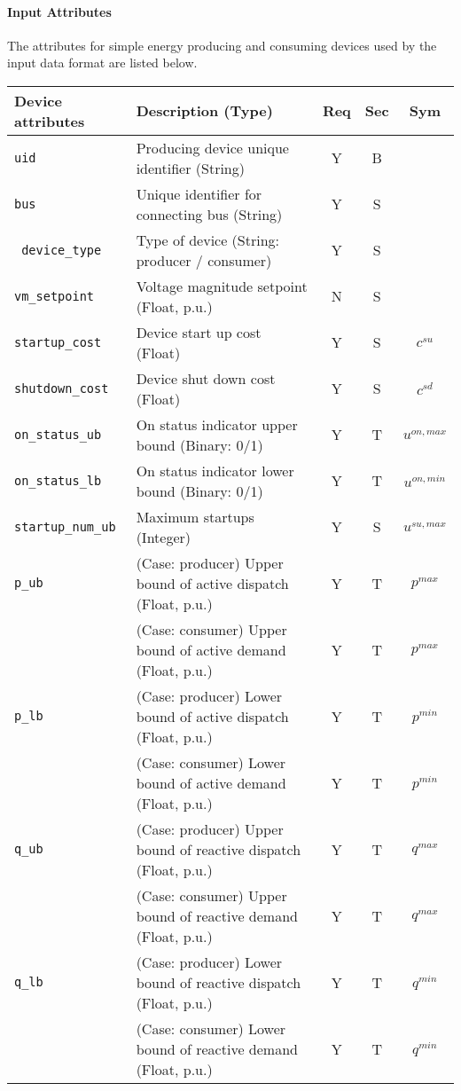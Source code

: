 \documentclass{article}
\begin{document}
\paragraph{Input Attributes} The attributes for 
simple energy producing and consuming devices used by the input data format are listed below.

\begin{center}
\small
\begin{tabular}{ l | l | c | c | c |}
Device attributes & Description (Type) & Req & Sec & Sym\\
\hline
  {\tt uid} & Producing device unique identifier (String) & Y & B &  \\
  {\tt bus} & Unique identifier for connecting bus (String)& Y & S & \\
  {\tt\color{red} device\_type} & Type of device (String: producer / consumer) & Y & S & \\
  {\tt vm\_setpoint} & Voltage magnitude setpoint (Float, p.u.) & N & S & \\
  {\tt startup\_cost} & Device start up cost (Float) & Y & S & $c^{su}$\\
  {\tt shutdown\_cost} & Device shut down cost (Float) & Y & S & $c^{sd}$\\  
  {\tt on\_status\_ub} & On status indicator upper bound (Binary: 0/1) & Y & T & $u^{on,max}$\\
  {\tt on\_status\_lb} & On status indicator lower bound (Binary: 0/1) & Y & T & $u^{on,min}$\\

  {\tt startup\_num\_ub} & Maximum startups (Integer) & Y & S & $u^{su,max}$\\  
  {\tt p\_ub} & {\color{red} (Case: producer) Upper bound of active dispatch (Float, p.u.)   }& Y & T & $p^{max}$ \\
              & {\color{red} (Case: consumer) Upper bound of active demand   (Float, p.u.)   }& Y & T & $p^{max}$ \\
  {\tt p\_lb} & {\color{red} (Case: producer) Lower bound of active dispatch (Float, p.u.)   }& Y & T & $p^{min}$ \\
              & {\color{red} (Case: consumer) Lower bound of active demand   (Float, p.u.)   }& Y & T & $p^{min}$ \\
  {\tt q\_ub} & {\color{red} (Case: producer) Upper bound of reactive dispatch (Float, p.u.) }& Y & T & $q^{max}$\\
              & {\color{red} (Case: consumer) Upper bound of reactive demand   (Float, p.u.) }& Y & T & $q^{max}$\\
  {\tt q\_lb} & {\color{red} (Case: producer) Lower bound of reactive dispatch (Float, p.u.) }& Y & T & $q^{min}$\\ 
              & {\color{red} (Case: consumer) Lower bound of reactive demand   (Float, p.u.) }& Y & T & $q^{min}$\\ 


\end{tabular}
\end{center}
\end{document}
